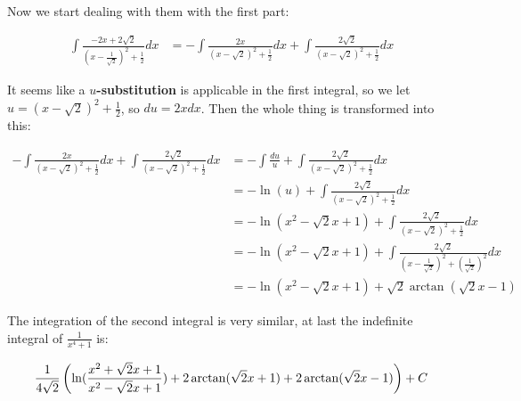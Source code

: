 Now we start dealing with them with the first part:

$$
\begin{aligned}
	\int\frac{-2x+2\sqrt2}{(x-\frac{1}{\sqrt2})^2+\frac{1}2}dx
	&=-\int\frac{2x}{(x-\sqrt2)^2+\frac{1}2}dx+
	\int\frac{2\sqrt2}{(x-\sqrt2)^2+\frac{1}2}dx
\end{aligned}
$$

It seems like a \textbf{$u$-substitution} is applicable in the first integral,
so we let $u=(x-\sqrt2)^2+\frac{1}2$, so $du=2xdx$. Then the whole thing is
transformed into this:

$$
\begin{aligned}
	-\int\frac{2x}{(x-\sqrt2)^2+\frac{1}2}dx+
	\int\frac{2\sqrt2}{(x-\sqrt2)^2+\frac{1}2}dx
	&=-\int\frac{du}u+
	\int\frac{2\sqrt2}{(x-\sqrt2)^2+\frac{1}2}dx \\
	&=-\ln(u)+
	\int\frac{2\sqrt2}{(x-\sqrt2)^2+\frac{1}2}dx \\
	&=-\ln(x^2-\sqrt2x+1)+
	\int\frac{2\sqrt2}{(x-\sqrt2)^2+\frac{1}2}dx \\
	&=-\ln(x^2-\sqrt2x+1)+
	\int\frac{2\sqrt2}{(x-\frac{1}{\sqrt2})^2
	+(\frac{1}{\sqrt2})^2}dx \\
	&=-\ln(x^2-\sqrt2x+1)+\sqrt2\arctan(\sqrt2x-1)
\end{aligned}
$$

The integration of the second integral is very similar, at last the indefinite
integral of $\frac1{x^4+1}$ is:

$$
\frac1{4\sqrt2}\left(\ln({x^2+\sqrt2x+1\over x^2-\sqrt2x+1})+
2\arctan(\sqrt2x+1)+2\arctan(\sqrt2x-1)\right)+C
$$

